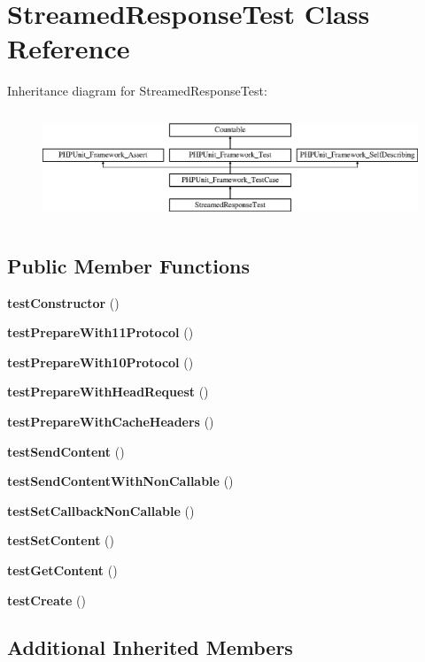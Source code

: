 \section{Streamed\+Response\+Test Class Reference}
\label{class_symfony_1_1_component_1_1_http_foundation_1_1_tests_1_1_streamed_response_test}
Inheritance diagram for Streamed\+Response\+Test\+:\begin{figure}[H]
\begin{center}
\leavevmode
\includegraphics[height=3.303835cm]{class_symfony_1_1_component_1_1_http_foundation_1_1_tests_1_1_streamed_response_test}
\end{center}
\end{figure}
\subsection*{Public Member Functions}
\begin{DoxyCompactItemize}
\item 
{\bf test\+Constructor} ()
\item 
{\bf test\+Prepare\+With11\+Protocol} ()
\item 
{\bf test\+Prepare\+With10\+Protocol} ()
\item 
{\bf test\+Prepare\+With\+Head\+Request} ()
\item 
{\bf test\+Prepare\+With\+Cache\+Headers} ()
\item 
{\bf test\+Send\+Content} ()
\item 
{\bf test\+Send\+Content\+With\+Non\+Callable} ()
\item 
{\bf test\+Set\+Callback\+Non\+Callable} ()
\item 
{\bf test\+Set\+Content} ()
\item 
{\bf test\+Get\+Content} ()
\item 
{\bf test\+Create} ()
\end{DoxyCompactItemize}
\subsection*{Additional Inherited Members}


